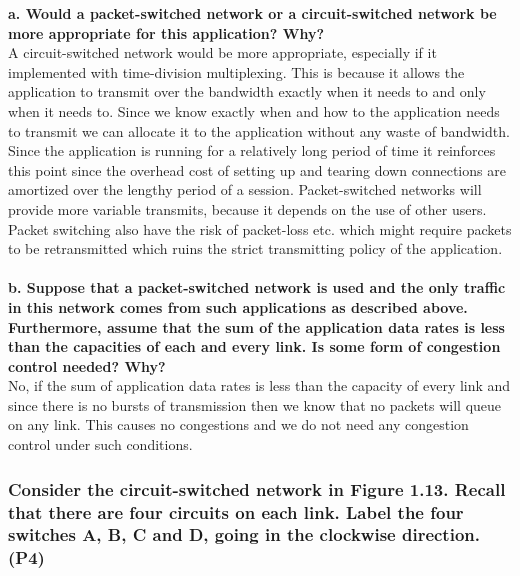 \textbf{a. Would a packet-switched network or a circuit-switched network be more appropriate for this application? Why?}\\
A circuit-switched network would be more appropriate, especially if it implemented with time-division multiplexing. This is because it allows the application to transmit over the bandwidth exactly when it needs to and only when it needs to. Since we know exactly when and how to the application needs to transmit we can allocate it to the application without any waste of bandwidth. Since the application is running for a relatively long period of time it reinforces this point since the overhead cost of setting up and tearing down connections are amortized over the lengthy period of a session. Packet-switched networks will provide more variable transmits, because it depends on the use of other users. Packet switching also have the risk of packet-loss etc. which might require packets to be retransmitted which ruins the strict transmitting policy of the application. \\
\\
\textbf{b. Suppose that a packet-switched network is used and the only traffic in this network comes from such applications as described above. Furthermore, assume that the sum of the application data rates is less than the capacities of each and every link. Is some form of congestion control needed? Why?}\\
No, if the sum of application data rates is less than the capacity of every link and since there is no bursts of transmission then we know that no packets will queue on any link. This causes no congestions and we do not need any congestion control under such conditions.



\subsubsection{Consider the circuit-switched network in Figure 1.13. Recall that there are four circuits on each link. Label the four switches A, B, C and D, going in the clockwise direction. (P4)}

